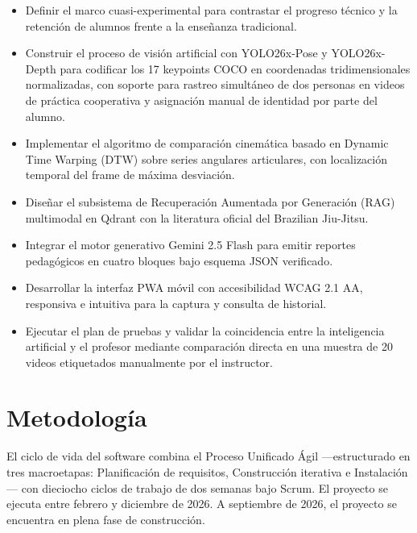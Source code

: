 \documentclass[12pt,letterpaper]{article}
\begin{document}
\begin{itemize}
    \item Definir el marco cuasi-experimental para contrastar el progreso técnico y la retención de alumnos frente a la enseñanza tradicional.
    \item Construir el proceso de visión artificial con YOLO26x-Pose y YOLO26x-Depth para codificar los 17 keypoints COCO en coordenadas tridimensionales normalizadas, con soporte para rastreo simultáneo de dos personas en videos de práctica cooperativa y asignación manual de identidad por parte del alumno.
    \item Implementar el algoritmo de comparación cinemática basado en Dynamic Time Warping (DTW) sobre series angulares articulares, con localización temporal del frame de máxima desviación.
    \item Diseñar el subsistema de Recuperación Aumentada por Generación (RAG) multimodal en Qdrant con la literatura oficial del Brazilian Jiu-Jitsu.
    \item Integrar el motor generativo Gemini 2.5 Flash para emitir reportes pedagógicos en cuatro bloques bajo esquema JSON verificado.
    \item Desarrollar la interfaz PWA móvil con accesibilidad WCAG 2.1 AA, responsiva e intuitiva para la captura y consulta de historial.
    \item Ejecutar el plan de pruebas y validar la coincidencia entre la inteligencia artificial y el profesor mediante comparación directa en una muestra de 20 videos etiquetados manualmente por el instructor.
\end{itemize}

\section{Metodología}

El ciclo de vida del software combina el Proceso Unificado Ágil —estructurado en tres macroetapas: Planificación de requisitos, Construcción iterativa e Instalación— con dieciocho ciclos de trabajo de dos semanas bajo Scrum. El proyecto se ejecuta entre febrero y diciembre de 2026. A septiembre de 2026, el proyecto se encuentra en plena fase de construcción.

\clearpage
\renewcommand{\thesection}{2.\arabic{section}}
\renewcommand{\thesubsection}{2.\arabic{section}.\arabic{subsection}}
\setcounter{section}{0}
\end{document}

